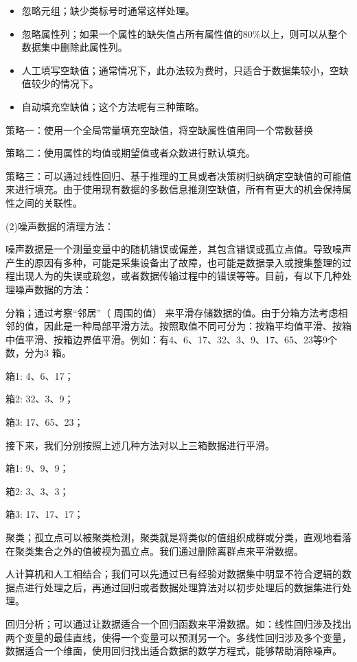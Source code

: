 \begin{itemize}
	\item 忽略元组；缺少类标号时通常这样处理。
	\item 忽略属性列；如果一个属性的缺失值占所有属性值的80\%以上，则可以从整个数据集中删除此属性列。
	\item 人工填写空缺值；通常情况下，此办法较为费时，只适合于数据集较小，空缺值较少的情况下。
	\item 自动填充空缺值；这个方法呢有三种策略。
\end{itemize}

策略一：使用一个全局常量填充空缺值，将空缺属性值用同一个常数替换

策略二：使用属性的均值或期望值或者众数进行默认填充。

策略三：可以通过线性回归、基于推理的工具或者决策树归纳确定空缺值的可能值来进行填充。由于使用现有数据的多数信息推测空缺值，所有有更大的机会保持属性之间的关联性。

(2)噪声数据的清理方法：

噪声数据是一个测量变量中的随机错误或偏差，其包含错误或孤立点值。导致噪声产生的原因有多种，可能是采集设备出了故障，也可能是数据录入或搜集整理的过程出现人为的失误或疏忽，或者数据传输过程中的错误等等。目前，有以下几种处理噪声数据的方法：

分箱；通过考察“邻居”（ 周围的值） 来平滑存储数据的值。由于分箱方法考虑相邻的值，因此是一种局部平滑方法。按照取值不同可分为：按箱平均值平滑、按箱中值平滑、按箱边界值平滑。例如：有4、6、17、32、3、9、17、65、23等9个数，分为3 箱。

箱1: 4、6、17；

箱2: 32、3、9；

箱3: 17、65、23；

接下来，我们分别按照上述几种方法对以上三箱数据进行平滑。

箱1: 9、9、9；

箱2: 3、3、3；

箱3: 17、17、17；

聚类；孤立点可以被聚类检测，聚类就是将类似的值组织成群或分类，直观地看落在聚类集合之外的值被视为孤立点。我们通过删除离群点来平滑数据。

人计算机和人工相结合；我们可以先通过已有经验对数据集中明显不符合逻辑的数据点进行处理之后，再通过回归或者数据处理算法对以初步处理后的数据集进行处理。

回归分析；可以通过让数据适合一个回归函数来平滑数据。如：线性回归涉及找出两个变量的最佳直线，使得一个变量可以预测另一个。多线性回归涉及多个变量，数据适合一个维面，使用回归找出适合数据的数学方程式，能够帮助消除噪声。

